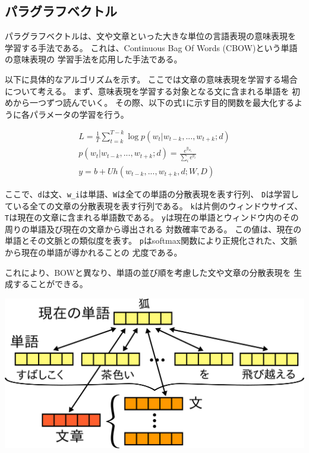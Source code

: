 \documentclass[11pt,a4paper]{ltjsarticle}
\let\originalfigure\figure
\let\endoriginalfigure\endfigure
\renewenvironment{figure}[1][ht]{%
  \originalfigure[#1]\centering}%
  {\endoriginalfigure}
\begin{document}
\subsection{パラグラフベクトル}

パラグラフベクトルは、文や文章といった大きな単位の言語表現の意味表現を
学習する手法である。 これは、Continuous Bag Of Words
(CBOW)という単語の意味表現の 学習手法を応用した手法である。

以下に具体的なアルゴリズムを示す。
ここでは文章の意味表現を学習する場合について考える。
まず、意味表現を学習する対象となる文に含まれる単語を
初めから一つずつ読んでいく。
その際、以下の式1に示す目的関数を最大化するように各パラメータの学習を行う。

\begin{gather}
  L = \frac{1}{T} \sum^{T - k}_{t = k} \log p(w_t | w_{t-k}, ..., w_{t+k}; d) \\
  p(w_t | w_{t-k}, ..., w_{t+k}; d) = \frac{e^{y_{w_t}}}{\sum_i e^{y_i}} \\
  y = b + Uh(w_{t-k}, ..., w_{t+k}, d; W, D)
\end{gather}

ここで、\texttt{d}は文、\texttt{w\_i}は単語、\texttt{W}は全ての単語の分散表現を表す行列、
\texttt{D}は学習している全ての文章の分散表現を表す行列である。
\texttt{k}は片側のウィンドウサイズ、
\texttt{T}は現在の文章に含まれる単語数である。
\texttt{y}は現在の単語とウィンドウ内のその周りの単語及び現在の文章から導出される
対数確率である。 この値は、現在の単語とその文脈との類似度を表す。
\texttt{p}はsoftmax関数により正規化された、文脈から現在の単語が導かれることの
尤度である。

これにより、BOWと異なり、単語の並び順を考慮した文や文章の分散表現を
生成することができる。

\begin{figure}
  \includegraphics{fig/dvsvwv.png}
  \caption{文書及び文ベクトルの学習の概略}
\end{figure}
\end{document}
